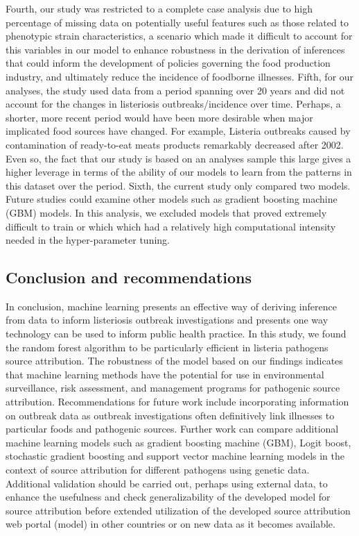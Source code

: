 \documentclass[
  10pt,
]{article}
\begin{document}
Fourth, our study was restricted to a complete case analysis due to high percentage of missing data on potentially useful features such as those related to phenotypic strain characteristics, a scenario which made it difficult to account for this variables in our model to enhance robustness in the derivation of inferences that could inform the development of policies governing the food production industry, and ultimately reduce the incidence of foodborne illnesses. Fifth, for our analyses, the study used data from a period spanning over 20 years and did not account for the changes in listeriosis outbreaks/incidence over time. Perhaps, a shorter, more recent period would have been more desirable when major implicated food sources have changed. For example, Listeria outbreaks caused by contamination of ready-to-eat meats products remarkably decreased after 2002. Even so, the fact that our study is based on an analyses sample this large gives a higher leverage in terms of the ability of our models to learn from the patterns in this dataset over the period. Sixth, the current study only compared two models. Future studies could examine other models such as gradient boosting machine (GBM) models. In this analysis, we excluded models that proved extremely difficult to train or which which had a relatively high computational intensity needed in the hyper-parameter tuning.

\hypertarget{conclusion-and-recommendations}{%
\subsection{Conclusion and recommendations}\label{conclusion-and-recommendations}}

In conclusion, machine learning presents an effective way of deriving inference from data to inform listeriosis outbreak investigations and presents one way technology can be used to inform public health practice. In this study, we found the random forest algorithm to be particularly efficient in listeria pathogens source attribution. The robustness of the model based on our findings indicates that machine learning methods have the potential for use in environmental surveillance, risk assessment, and management programs for pathogenic source attribution. Recommendations for future work include incorporating information on outbreak data as outbreak investigations often definitively link illnesses to particular foods and pathogenic sources. Further work can compare additional machine learning models such as gradient boosting machine (GBM), Logit boost, stochastic gradient boosting and support vector machine learning models in the context of source attribution for different pathogens using genetic data. Additional validation should be carried out, perhaps using external data, to enhance the usefulness and check generalizability of the developed model for source attribution before extended utilization of the developed source attribution web portal (model) in other countries or on new data as it becomes available.
\end{document}

